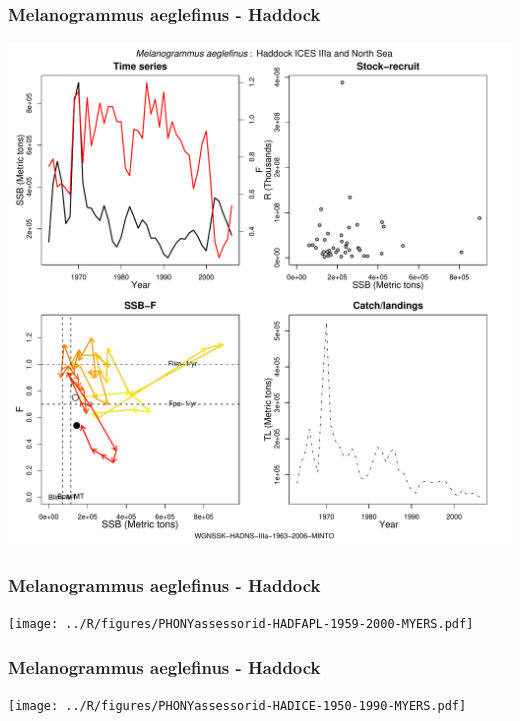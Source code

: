 \subsubsection{Melanogrammus aeglefinus - Haddock}
\begin{center}
\includegraphics[width=1.2\textwidth]{../R/figures/WGNSSK-HADNS-IIIa-1963-2006-MINTO.pdf}
\end{center}

\subsubsection{Melanogrammus aeglefinus - Haddock}
\begin{center}
\texttt{[image: ../R/figures/PHONYassessorid-HADFAPL-1959-2000-MYERS.pdf]}
\end{center}

\subsubsection{Melanogrammus aeglefinus - Haddock}
\begin{center}
\texttt{[image: ../R/figures/PHONYassessorid-HADICE-1950-1990-MYERS.pdf]}
\end{center}

